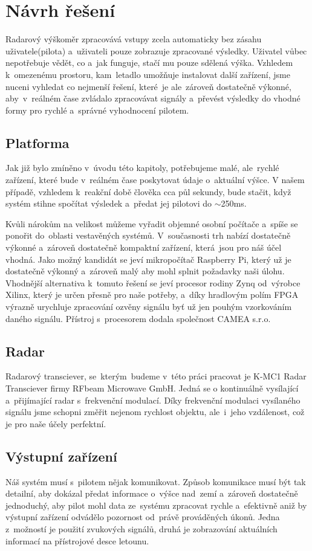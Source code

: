 \chapter{Návrh řešení}\label{navrhReseni}
	Radarový výškoměr zpracovává vstupy zcela automaticky bez zásahu uživatele(pilota) a~uživateli pouze zobrazuje zpracované výsledky. Uživatel vůbec nepotřebuje vědět, co a~jak funguje, stačí mu pouze sdělená výška. Vzhledem k~omezenému prostoru, kam~letadlo umožňuje instalovat další zařízení, jsme nuceni vyhledat co nejmenší řešení, které~je ale~zároveň dostatečně výkonné, aby~v~reálném čase zvládalo zpracovávat signály a~převést výsledky do vhodné formy pro rychlé a~správné vyhodnocení pilotem.
	
	\section{Platforma}\label{navrhReseni::platforma}
		Jak již bylo zmíněno v~úvodu této kapitoly, potřebujeme malé, ale~rychlé zařízení, které bude v~reálném čase poskytovat údaje o~aktuální výšce. V našem případě, vzhledem k~reakční době člověka cca půl sekundy, bude stačit, když systém stihne spočítat výsledek a~předat jej pilotovi do $\sim$250ms.\par
		
		Kvůli nárokům na velikost můžeme vyřadit objemné osobní počítače a~spíše se ponořit do~oblasti vestavěných systémů. V~současnosti trh nabízí dostatečně výkonné a~zároveň dostatečně kompaktní zařízení, která~jsou pro náš účel vhodná. Jako možný kandidát se jeví mikropočítač Raspberry Pi, který už je dostatečně výkonný a~zároveň malý aby mohl splnit požadavky naši úlohu. Vhodnější alternativa k~tomuto řešení se jeví procesor rodiny Zynq od~výrobce Xilinx, který je určen přesně pro naše potřeby, a~díky hradlovým polím FPGA výrazně urychluje zpracování ozvěny signálu byť už jen pouhým vzorkováním daného signálu. Přístroj s~procesorem dodala společnost CAMEA s.r.o.
	\section{Radar}
		Radarový transciever, se~kterým~budeme v~této práci pracovat je K-MC1 Radar Transciever firmy RFbeam Microwave GmbH. Jedná se o kontinuálně vysílající a~přijímající radar s~frekvenční modulací. Díky frekvenční modulaci vysílaného signálu jsme schopni změřit nejenom rychlost objektu, ale~i~jeho vzdálenost, což je pro naše účely perfektní.
	
		
	\section{Výstupní zařízení}
		Náš systém musí s~pilotem nějak komunikovat. Způsob komunikace musí být tak detailní, aby dokázal předat informace o~výšce nad~zemí a~zároveň dostatečně jednoduchý, aby pilot mohl data ze~systému zpracovat rychle a~efektivně aniž by výstupní zařízení odvádělo pozornost od~právě prováděných úkonů. Jedna z~možností je použití zvukových signálů, druhá je zobrazování aktuálních informací na přístrojové desce letounu.
			
